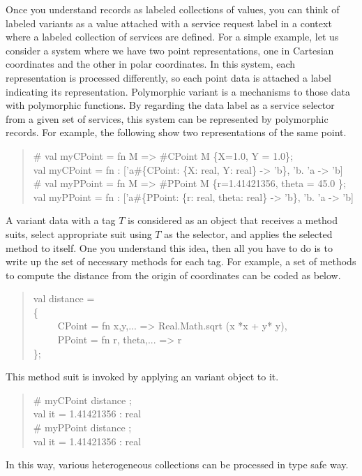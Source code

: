 \documentclass{jbook}
\newenvironment{program}{\begin{tt}\begin{quote}}{\end{quote}\end{tt}}
\newcommand{\myem}{\ \ \ \ \  }
\begin{document}
	Once you understand records as labeled collections of values,
you can think of labeled variants as a value attached with a service 
request label in a context where a labeled collection of services are
defined. 
	For a simple example, let us consider a system where we have two
point representations, one in Cartesian coordinates and the other in
polar coordinates.
	In this system, each representation is processed differently, so
each point data is attached a label indicating its representation.
	Polymorphic variant is a mechanisms to those data with
polymorphic functions.
	By regarding the data label as a service selector from a given
set of services, this system can be represented by polymorphic records.
	For example, the following show two representations of the same
point.
\begin{tt}\begin{quote}
\# val myCPoint = fn M => \#CPoint M \{X=1.0, Y = 1.0\};\\
val myCPoint = fn : ['a\#\{CPoint: \{X: real, Y: real\} -> 'b\}, 'b. 'a -> 'b]\\
\# val myPPoint = fn M => \#PPoint M \{r=1.41421356, theta = 45.0 \};\\
val myPPoint = fn : ['a\#\{PPoint: \{r: real, theta: real\} -> 'b\}, 'b. 'a -> 'b]
\end{quote}\end{tt}
	A variant data with a tag $T$ is considered as an object that
receives a method suits, select appropriate suit using $T$ as the
selector, and applies the selected method to itself.
	One you understand this idea, then all you have to do is to
write up the set of necessary methods for each tag.
	For example, a set of methods to compute the distance from the
origin of coordinates can be coded as below.
\begin{program}
val distance = \\
\{\\
\myem CPoint = fn {x,y,...} => Real.Math.sqrt (x *x + y* y),\\
\myem PPoint = fn {r, theta,...} => r\\
\};
\end{program}
	This method suit is invoked by applying an variant object to it.
\begin{tt}\begin{quote}
\# myCPoint distance ;\\
val it = 1.41421356 : real\\
\# myPPoint distance ;\\
val it = 1.41421356 : real
\end{quote}\end{tt}
	In this way, various heterogeneous collections can be processed
in type safe way.
\fi%
\end{document}
